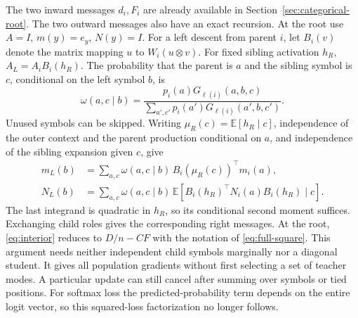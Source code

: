 The two inward messages $d_i,F_i$ are already available in
Section~\ref{sec:categorical-root}. The two outward messages also have an
exact recursion. At the root use $A=I$, $m(y)=e_y$, $N(y)=I$.
For a left descent from parent $i$, let $B_i(v)$ denote the matrix
mapping $u$ to $W_i(u\otimes v)$. For fixed sibling activation $h_R$,
$A_L=A_i B_i(h_R)$. The probability that the parent is $a$ and the
sibling symbol is $c$, conditional on the left symbol $b$, is
\[
 \omega(a,c\mid b)=\frac{p_i(a)G_{\ell(i)}(a,b,c)}
 {\sum_{a',c'}p_i(a')G_{\ell(i)}(a',b,c')}.
\]
Unused symbols can be skipped. Writing $\mu_R(c)=\mathbb E[h_R\mid c]$,
independence of the outer context and the parent production conditional
on $a$, and independence of the sibling expansion given $c$, give
\begin{align*}
 m_L(b)&=\sum_{a,c}\omega(a,c\mid b)\,
        B_i(\mu_R(c))^\top m_i(a),\\
 N_L(b)&=\sum_{a,c}\omega(a,c\mid b)\,
 \mathbb E[B_i(h_R)^\top N_i(a) B_i(h_R)\mid c].
\end{align*}
The last integrand is quadratic in $h_R$, so its conditional second
moment suffices. Exchanging child roles gives the corresponding right
messages. At the root, \eqref{eq:interior} reduces to $D/n-CF$ with the
notation of \eqref{eq:full-square}. This argument needs neither independent
child symbols marginally nor a diagonal student. It gives all population
gradients without first selecting a set of teacher modes. A particular
update can still cancel after summing over symbols or tied positions.
For softmax loss the predicted-probability term depends on the entire
logit vector, so this squared-loss factorization no longer follows.
